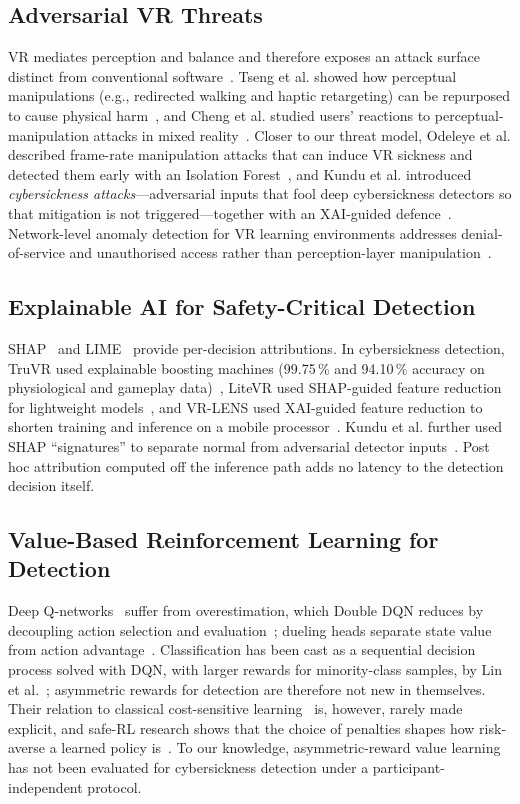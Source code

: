 \subsection{Adversarial VR Threats}
VR mediates perception and balance and therefore exposes an attack surface distinct from conventional software~\cite{odeleye2023virtually,giaretta2025security}. Tseng et al. showed how perceptual manipulations (e.g., redirected walking and haptic retargeting) can be repurposed to cause physical harm~\cite{tseng2022dark}, and Cheng et al. studied users' reactions to perceptual-manipulation attacks in mixed reality~\cite{cheng2023perceptual}. Closer to our threat model, Odeleye et al. described frame-rate manipulation attacks that can induce VR sickness and detected them early with an Isolation Forest~\cite{odeleye2021framerate}, and Kundu et al. introduced \emph{cybersickness attacks}---adversarial inputs that fool deep cybersickness detectors so that mitigation is not triggered---together with an XAI-guided defence~\cite{kundu2025securing}. Network-level anomaly detection for VR learning environments addresses denial-of-service and unauthorised access rather than perception-layer manipulation~\cite{valluripally2023detection}.

\subsection{Explainable AI for Safety-Critical Detection}
SHAP~\cite{lundberg2017shap} and LIME~\cite{ribeiro2016lime} provide per-decision attributions. In cybersickness detection, TruVR used explainable boosting machines (99.75\,\% and 94.10\,\% accuracy on physiological and gameplay data)~\cite{kundu2022truvr}, LiteVR used SHAP-guided feature reduction for lightweight models~\cite{kundu2023litevr}, and VR-LENS used XAI-guided feature reduction to shorten training and inference on a mobile processor~\cite{kundu2023vrlens}. Kundu et al. further used SHAP ``signatures'' to separate normal from adversarial detector inputs~\cite{kundu2025securing}. Post hoc attribution computed off the inference path adds no latency to the detection decision itself.

\subsection{Value-Based Reinforcement Learning for Detection}
Deep Q-networks~\cite{mnih2015human} suffer from overestimation, which Double DQN reduces by decoupling action selection and evaluation~\cite{vanhasselt2016double}; dueling heads separate state value from action advantage~\cite{wang2016dueling}. Classification has been cast as a sequential decision process solved with DQN, with larger rewards for minority-class samples, by Lin et al.~\cite{lin2020imbalanced}; asymmetric rewards for detection are therefore not new in themselves. Their relation to classical cost-sensitive learning~\cite{elkan2001cost} is, however, rarely made explicit, and safe-RL research shows that the choice of penalties shapes how risk-averse a learned policy is~\cite{garcia2015safe}. To our knowledge, asymmetric-reward value learning has not been evaluated for cybersickness detection under a participant-independent protocol.

